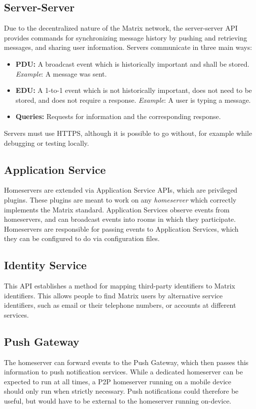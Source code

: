 \subsection{Server-Server}
Due to the decentralized nature of the Matrix network, the server-server \ac{API} provides commands for synchronizing message history by pushing and retrieving messages, and sharing user information.
Servers communicate in three main ways:
\begin{itemize}
	\item{
	      \textbf{\ac{PDU}:}
	      A broadcast event which is historically important and shall be stored.
	      \textit{Example}: A message was sent.
	      }
	\item{
	      \textbf{\ac{EDU}:}
	      A 1-to-1 event which is not historically important, does not need to be stored, and does not require a response.
	      \textit{Example}: A user is typing a message.
	      }
	\item{
	      \textbf{Queries:}
	      Requests for information and the corresponding response.
	      }
\end{itemize}
Servers must use \ac{HTTPS}, although it is possible to go without, for example while debugging or testing locally.

\subsection{Application Service}
Homeservers are extended via Application Service \ac{API}s, which are privileged plugins.
These plugins are meant to work on any \textit{homeserver} which correctly implements the Matrix standard.
Application Services observe events from homeservers, and can broadcast events into rooms in which they participate.
Homeservers are responsible for passing events to Application Services, which they can be configured to do via configuration files.

\subsection{Identity Service}
This \ac{API} establishes a method for mapping third-party identifiers to Matrix identifiers.
This allows people to find Matrix users by alternative service identifiers, such as email or their telephone numbers, or accounts at different services.

\subsection{Push Gateway}
The homeserver can forward events to the Push Gateway, which then passes this information to push notification services.
While a dedicated homeserver can be expected to run at all times, a \ac{P2P} homeserver running on a mobile device should only run when strictly necessary.
Push notifications could therefore be useful, but would have to be external to the homeserver running on-device.


